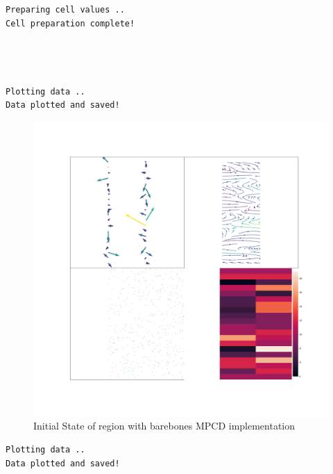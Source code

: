 \documentclass[
]{article}
\begin{document}
\begin{verbatim}
Preparing cell values ..
Cell preparation complete!




Plotting data ..
Data plotted and saved!
\end{verbatim}

\begin{figure}
\centering
\includegraphics{Assets/initial_region.png}
\caption{Initial State of region with barebones MPCD implementation}
\end{figure}

\begin{verbatim}
Plotting data ..
Data plotted and saved!
\end{verbatim}
\end{document}
